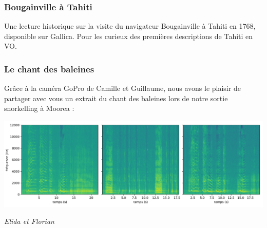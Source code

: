 \hypertarget{bougainville-uxe0-tahiti}{%
\subsubsection{Bougainville à Tahiti}\label{bougainville-uxe0-tahiti}}

Une lecture historique sur la visite du navigateur Bougainville à Tahiti
en 1768, disponible sur Gallica. Pour les curieux des premières
descriptions de Tahiti en VO.

\hypertarget{le-chant-des-baleines}{%
\subsubsection{Le chant des baleines}\label{le-chant-des-baleines}}

Grâce à la caméra GoPro de Camille et Guillaume, nous avons le plaisir
de partager avec vous un extrait du chant des baleines lors de notre
sortie snorkelling à Moorea :

\includegraphics{spectrogram/baleines.png}

\emph{Elida et Florian}
